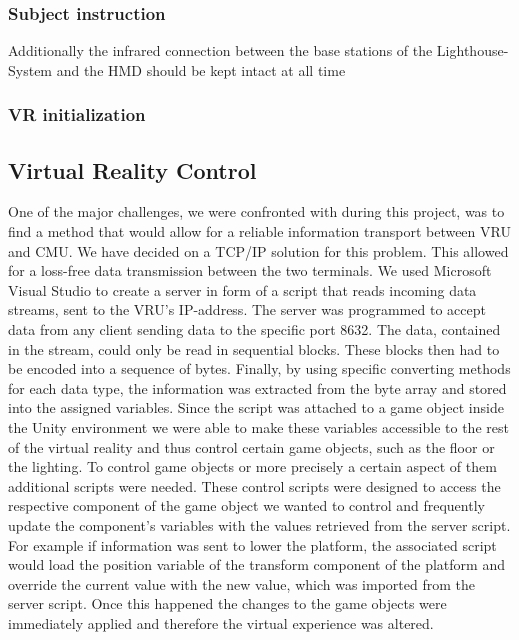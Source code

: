 \subsubsection{Subject instruction}
Additionally the infrared connection between the base stations of the Lighthouse-System and the HMD should be kept intact at all time
\subsubsection{VR initialization}

\subsection{Virtual Reality Control}\label{VRControl}
One of the major challenges, we were confronted with during this project, was to find a method that would allow for a reliable information transport between VRU and CMU. We have decided on a TCP/IP solution for this problem. This allowed for a loss-free data transmission between the two terminals. 
We used Microsoft Visual Studio to create a server in form of a script that reads incoming data streams, sent to the VRU's IP-address. The server was programmed to accept data from any client sending data to the specific port 8632. The data, contained in the stream, could only be read in sequential blocks. These blocks then had to be encoded into a sequence of bytes. Finally, by using specific converting methods for each data type, the information was extracted from the byte array and stored into the assigned variables. Since the script was attached to a game object inside the Unity environment we were able to make these variables accessible to the rest of the virtual reality and thus control certain game objects, such as the floor or the lighting. To control game objects or more precisely a certain aspect of them additional scripts were needed. These control scripts were designed to access the respective component of the game object we wanted to control and frequently update the component's variables with the values retrieved from the server script. For example if information was sent to lower the platform, the associated script would load the position variable of the transform component of the platform and override the current value with the new value, which was imported from the server script. Once this happened the changes to the game objects were immediately applied and therefore the virtual experience was altered.\\

